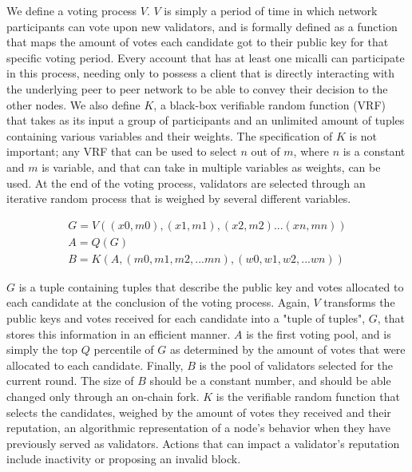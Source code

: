 \documentclass[conference]{IEEEtran}
\begin{document}
We define a voting process $V$. $V$ is simply a period of time in which network participants can vote upon new validators, and is formally defined as a function that maps the amount of votes each candidate got to their public key for that specific voting period. Every account that has at least one micalli can participate in this process, needing only to possess a client that is directly interacting with the underlying peer to peer network to be able to convey their decision to the other nodes. We also define $K$, a black-box verifiable random function (VRF) that takes as its input a group of participants and an unlimited amount of tuples containing various variables and their weights. The specification of $K$ is not important; any VRF that can be used to select $n$ out of $m$, where $n$ is a constant and $m$ is variable, and that can take in multiple variables as weights, can be used.  At the end of the voting process, validators are selected through an iterative random process that is weighed by several different variables. 

\begin{eqnarray}
G = V((x0,m0),(x1,m1),(x2,m2)...(xn,mn))\\
A = Q(G)\\
B = K(A, (m0,m1,m2,...mn), (w0,w1,w2,...wn))
\end{eqnarray}

$G$ is a tuple containing tuples that describe the public key and votes allocated to each candidate at the conclusion of the voting process. Again, $V$ transforms the public keys and votes received for each candidate into a "tuple of tuples", $G$, that stores this information in an efficient manner. $A$ is the first voting pool, and is simply the top $Q$ percentile of $G$ as determined by the amount of votes that were allocated to each candidate. Finally, $B$ is the pool of validators selected for the current round. The size of $B$ should be a constant number, and should be able changed only through an on-chain fork. $K$ is the verifiable random function that selects the candidates, weighed by the amount of votes they received and their reputation, an algorithmic representation of a node's behavior when they have previously served as validators. Actions that can impact a validator's reputation include inactivity or proposing an invalid block.
\end{document}
